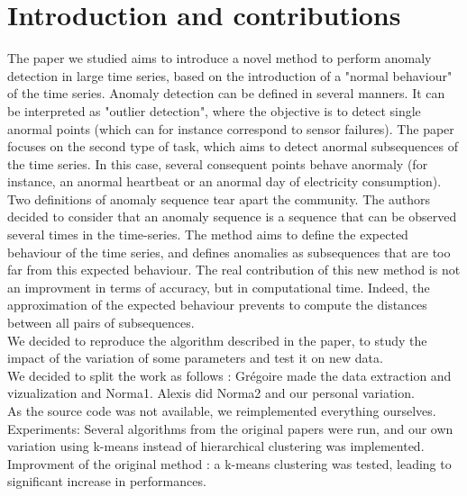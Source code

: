 \documentclass[11pt]{article}
\begin{document}
\section{Introduction and contributions}
The paper we studied aims to introduce a novel method to perform anomaly detection in large time series, based on the introduction of a "normal behaviour" of the time series.
Anomaly detection can be defined in several manners. 
It can be interpreted as "outlier detection", where the objective is to detect single anormal points (which can for instance correspond to sensor failures). 
The paper focuses on the second type of task, which aims to detect anormal subsequences of the time series. 
In this case, several consequent points behave anormaly (for instance, an anormal heartbeat or an anormal day of electricity consumption).
Two definitions of anomaly sequence tear apart the community.
The authors decided to consider that an anomaly sequence is a sequence that can be observed several times in the time-series. 
The method aims to define the expected behaviour of the time series, and defines anomalies as subsequences that are too far from this expected behaviour.
The real contribution of this new method is not an improvment in terms of accuracy, but in computational time. 
Indeed, the approximation of the expected behaviour prevents to compute the distances between all pairs of subsequences. \\[0.5cm]
We decided to reproduce the algorithm described in the paper, to study the impact of the variation of some parameters and test it on new data. \\[0.5cm]
We decided to split the work as follows : Grégoire made the data extraction and vizualization and Norma1. Alexis did Norma2 and our personal variation. \\[0.5cm]
As the source code was not available, we reimplemented everything ourselves. \\[0.5cm]
Experiments: Several algorithms from the original papers were run, and our own variation using k-means instead of hierarchical clustering was implemented.\\[0.5cm]
Improvment of the original method : a k-means clustering was tested, leading to significant increase in performances.\\[0.5cm]
\end{document}
